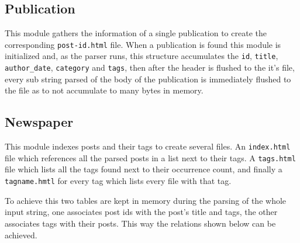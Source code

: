 \documentclass[a4paper]{report}
\begin{document}
\subsection{Publication}

This module gathers the information of a single publication to create the
corresponding \texttt{post-id.html} file. When a publication is found this
module is initialized and, as the parser runs, this structure accumulates the
\texttt{id}, \texttt{title}, \texttt{author\_date}, \texttt{category} and
\texttt{tags}, then after the header is flushed to the it's file, every sub
string parsed of the body of the publication is immediately flushed to the file
as to not accumulate to many bytes in memory.

\subsection{Newspaper}

This module indexes posts and their tags to create several files. An
\texttt{index.html} file which references all the parsed posts in a list next
to their tags. A \texttt{tags.html} file which lists all the tags found next to
their occurrence count, and finally a \texttt{tagname.hmtl} for every tag
which lists every file with that tag.

To achieve this two tables are kept in memory during the parsing of the whole
input string, one associates post ids with the post's title and tags, the other
associates tags with their posts. This way the relations shown below can be
achieved.
\end{document}
